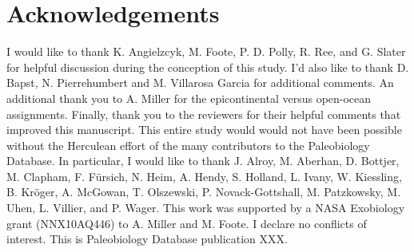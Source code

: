 \documentclass{article}
\begin{document}
\section*{Acknowledgements}
I would like to thank K. Angielzcyk, M. Foote, P. D. Polly, R. Ree, and G. Slater for helpful discussion during the conception of this study. I'd also like to thank D. Bapst, N. Pierrehumbert and M. Villarosa Garcia for additional comments. An additional thank you to  A. Miller for the epicontinental versus open-ocean assignments. Finally, thank you to the reviewers for their helpful comments that improved this manuscript. This entire study would would not have been possible without the Herculean effort of the many contributors to the Paleobiology Database. In particular, I would like to thank J. Alroy, M. Aberhan, D. Bottjer, M. Clapham, F. F\"{u}rsich, N. Heim, A. Hendy, S. Holland, L. Ivany, W. Kiessling, B. Kr\"{o}ger, A. McGowan, T. Olszewski, P. Novack-Gottshall, M. Patzkowsky, M. Uhen, L. Villier, and P. Wager. This work was supported by a NASA Exobiology grant (NNX10AQ446) to A. Miller and M. Foote. I declare no conflicts of interest. This is Paleobiology Database publication XXX.


\clearpage






\clearpage


\end{document}
